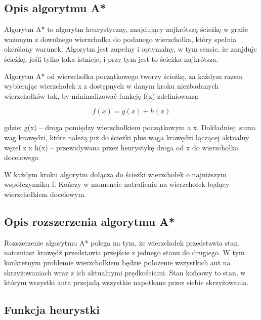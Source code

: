 \documentclass[../main.tex]{subfiles}
\begin{document}
 
\begin{figure}[bh]
\centering
 
\end{figure}

\subsection{Opis algorytmu A*}

Algorytm A* to algorytm heurystyczny, znajdujący najkrótszą ścieżkę w grafie ważonym z dowolnego wierzchołka do podanego wierzchołka, który spełnia okerślony warunek. Algorytm jest zupełny i optymalny, w tym sensie, że znajduje ścieżkę, jeśli tylko taka istnieje, i przy tym jest to ścieżka najkrótsza.


Algorytm A* od wierzchołka początkowego tworzy ścieżkę, za każdym razem wybierając wierzchołek x z dostępnych w danym kroku niezbadanych wierzchołków tak, by minimalizować funkcję f(x) zdefiniowaną:

\[ f(x) = g(x) + h(x) \]

gdzie:
\newline
g(x) – droga pomiędzy wierzchołkiem początkowym a x. Dokładniej: suma wag krawędzi, które należą już do ścieżki plus waga krawędzi łączącej aktualny węzeł z x
\newline
h(x) – przewidywana przez heurystykę droga od x do wierzchołka docelowego
\newline

W każdym kroku algorytm dołącza do ścieżki wierzchołek o najniższym współczynniku f. Kończy w momencie natrafienia na wierzchołek będący wierzchołkiem docelowym.

\subsection{Opis rozszerzenia algorytmu A*}

Rozszerzenie algorytmu A* polega na tym, że wierzchołek przedstawia stan, natomiast krawędź przedstawia przejście z jednego stanu do drugiego. W tym konkretnym problemie wierzchołkiem będzie położenie wszystkich aut na skrzyżowaniach wraz z ich aktualnymi prędkościami. 
\newline
\newline
Stan końcowy to stan, w którym wszystki auta przejadą wszystkie napotkane przez siebie skrzyżowania.


\subsection{Funkcja heurystki}
\end{document}
